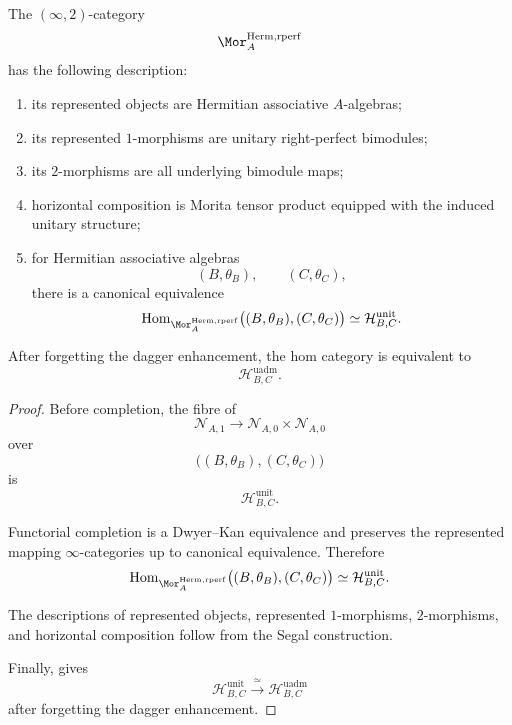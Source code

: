 \begin{proposition}
\label{prop:global-hermitian-morita-description}
The $(\infty,2)$-category
\[
    \Mor_A^{\mathrm{Herm,rperf}}
\]
has the following description:
\begin{enumerate}[label=(\roman*)]
    \item its represented objects are Hermitian associative
    $A$-algebras;

    \item its represented $1$-morphisms are unitary right-perfect
    bimodules;

    \item its $2$-morphisms are all underlying bimodule maps;

    \item horizontal composition is Morita tensor product equipped with
    the induced unitary structure;

    \item for Hermitian associative algebras
    \[
        (B,\theta_B),
        \qquad
        (C,\theta_C),
    \]
    there is a canonical equivalence
    \[
    \begin{aligned}
        \operatorname{Hom}_{\Mor_A^{\mathrm{Herm,rperf}}}
        \bigl(
            (B,\theta_B),
            (C,\theta_C)
        \bigr)
        \simeq
        \mathcal H^{\mathrm{unit}}_{B,C}.
    \end{aligned}
    \]
\end{enumerate}

After forgetting the dagger enhancement, the hom category is equivalent
to
\[
    \mathcal H^{\mathrm{uadm}}_{B,C}.
\]
\end{proposition}

\begin{proof}
Before completion, the fibre of
\[
    \mathcal N_{A,1}
    \longrightarrow
    \mathcal N_{A,0}\times\mathcal N_{A,0}
\]
over
\[
    \bigl(
        (B,\theta_B),
        (C,\theta_C)
    \bigr)
\]
is
\[
    \mathcal H^{\mathrm{unit}}_{B,C}.
\]

Functorial completion is a Dwyer--Kan equivalence and preserves the
represented mapping $\infty$-categories up to canonical equivalence.
Therefore
\[
\begin{aligned}
    \operatorname{Hom}_{\Mor_A^{\mathrm{Herm,rperf}}}
    \bigl(
        (B,\theta_B),
        (C,\theta_C)
    \bigr)
    \simeq
    \mathcal H^{\mathrm{unit}}_{B,C}.
\end{aligned}
\]

The descriptions of represented objects, represented $1$-morphisms,
$2$-morphisms, and horizontal composition follow from the Segal
construction.

Finally,
gives
\[
    \mathcal H^{\mathrm{unit}}_{B,C}
    \xrightarrow{\;\simeq\;}
    \mathcal H^{\mathrm{uadm}}_{B,C}
\]
after forgetting the dagger enhancement.
\end{proof}

